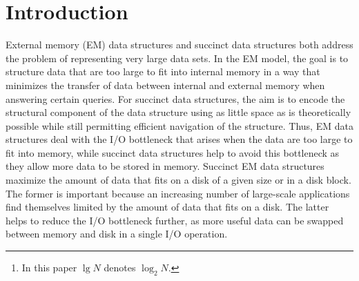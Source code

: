 {\date{Received: date / Accepted: date}


\maketitle

\begin{abstract}

  We present a technique for representing bounded-degree planar graphs
  in a succinct fashion while permitting I/O-efficient traversal of
  paths.
  Using our representation, a graph with $N$ vertices, each
  with an associated key of $\bitsPerKey = \OhOf{\lg N}$ bits,\footnote{In this
    paper $\lg{N}$ denotes $\log_2{N}$.} can be stored in $N\bitsPerKey
  + \OhOf{N} + \ohOf{N\bitsPerKey}$ bits and traversing a path of length $K$ 
  takes $\OhOf{K
  / \lg B}$ I/Os, where $B$ denotes the disk block size.
  By applying our construction to the dual of a terrain represented as a
  triangular irregular network, we can represent the terrain in the
  above space bounds and support path traversals on the terrain using
  $\OhOf{K / \lg B}$ I/Os, where $K$ is the number of triangles visited by
  the path.
  This is useful for answering a number of queries on the
  terrain, such as reporting terrain profiles, trickle paths, and
  connected components.

\end{abstract}


\section{Introduction}

External memory (EM) data structures and succinct data structures both
address the problem of representing very large data sets.
In the EM model, the goal is to structure data that are too large to fit into
internal memory in a way that minimizes the transfer of data between
internal and external memory when answering certain queries.
For succinct data structures, the aim is to encode the structural
component of the data structure using as little space as is
theoretically possible while still permitting efficient navigation of
the structure.
Thus, EM data structures deal with the I/O bottleneck
that arises when the data are too large to fit into memory, while
succinct data structures help to avoid this bottleneck as they allow
more data to be stored in memory.
Succinct EM data structures maximize the amount of data that fits on a disk of
a given size or in a disk block.
The former is important because an increasing number of
large-scale applications find themselves limited by the amount of data
that fits on a disk.
The latter helps to reduce the I/O bottleneck further, as more useful data
can be swapped between memory and disk in a single I/O operation.

}
